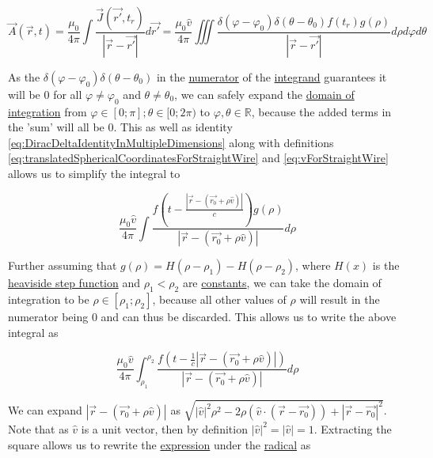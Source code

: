 ﻿\documentclass{article}
\begin{document}
\begin{equation*}
    \vec{A}(\vec{r}, t) = \frac{\mu_0}{4 \pi} \int \frac{\vec{J}(\vec{r'}, t_r)}{|\vec{r} - \vec{r'}|} d \vec{r'} = \frac{\mu_0 \hat{v}}{4 \pi} \iiint \frac{\delta(\varphi - \varphi_0) \delta(\theta - \theta_0) f(t_r) g(\rho)}{|\vec{r} - \vec{r'}|} d \rho d \varphi d \theta
\end{equation*}

As the $\delta(\varphi - \varphi_0) \delta(\theta - \theta_0)$ in the \href{https://en.wikipedia.org/wiki/Fraction}{numerator} of the \href{https://en.wikipedia.org/wiki/Integral#Terminology_and_notation}{integrand} guarantees it will be $0$ for all $\varphi \neq \varphi_0$ and $\theta \neq \theta_0$, we can safely expand the \href{https://en.wikipedia.org/wiki/Integral}{domain of integration} from $\varphi \in [0; \pi]; \theta \in [0; 2 \pi)$ to $\varphi, \theta \in \mathbb{R}$, because the added terms in the 'sum' will all be $0$. This as well as identity \ref{eq:DiracDeltaIdentityInMultipleDimensions} along with definitions \ref{eq:translatedSphericalCoordinatesForStraightWire} and \ref{eq:vForStraightWire} allows us to simplify the integral to

\begin{equation*}
    \frac{\mu_0 \hat{v}}{4 \pi} \int \frac{f \left( t - \frac{|\vec{r} - (\vec{r_0} + \rho \hat{v})|}{c} \right) g(\rho)}{|\vec{r} - (\vec{r_0} + \rho \hat{v})|} d \rho
\end{equation*}

Further assuming that $g(\rho) = H(\rho - \rho_1) - H(\rho - \rho_2)$, where $H(x)$ is the \href{https://en.wikipedia.org/wiki/Heaviside_step_function}{heaviside step function} and $\rho_1 < \rho_2$ are \href{https://en.wikipedia.org/wiki/Constant_(mathematics)}{constants}, we can take the domain of integration to be $\rho \in [\rho_1; \rho_2]$, because all other values of $\rho$ will result in the numerator being $0$ and can thus be discarded. This allows us to write the above integral as

\begin{equation*}
    \frac{\mu_0 \hat{v}}{4 \pi} \int_{\rho_1}^{\rho_2} \frac{f(t - \frac{1}{c} |\vec{r} - (\vec{r_0} + \rho \hat{v})|)}{|\vec{r} - (\vec{r_0} + \rho \hat{v})|} d \rho
\end{equation*}

We can expand $|\vec{r} - (\vec{r_0} + \rho \hat{v})|$ as $\sqrt{|\hat{v}|^2 \rho^2 - 2 \rho (\hat{v} \cdot (\vec{r} - \vec{r_0})) + |\vec{r} - \vec{r_0}|^2}$. Note that as $\hat{v}$ is a unit vector, then by definition $|\hat{v}|^2 = |\hat{v}| = 1$. Extracting the square allows us to rewrite the \href{https://en.wikipedia.org/wiki/Expression_(mathematics)}{expression} under the \href{https://en.wikipedia.org/wiki/Radical_symbol}{radical} as
\end{document}
